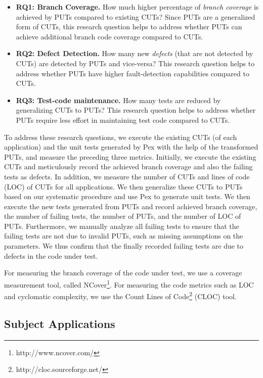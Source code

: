 \begin{itemize}
	\item \textbf{RQ1: Branch Coverage.} How much higher percentage of \emph{branch coverage} is achieved by PUTs compared to existing CUTs? Since PUTs are a generalized form of CUTs, this research question helps to address whether PUTs can achieve additional branch code coverage compared to CUTs.
	\item \textbf{RQ2: Defect Detection.} How many new \emph{defects} (that are not detected by CUTs) are detected by PUTs and vice-versa? This research question helps to address whether PUTs have higher fault-detection capabilities compared to CUTs.
	\item \textbf{RQ3: Test-code maintenance.} How many tests are reduced by generalizing CUTs to PUTs? This research question helps to address whether PUTs require less effort in maintaining test code compared to CUTs.
\end{itemize}

To address these research questions, we execute the existing CUTs (of each application) and the unit tests generated by Pex with the help of the transformed PUTs, and measure the preceding three metrics. Initially, we execute the existing CUTs and meticulously record the achieved branch coverage and also the failing tests as defects. In addition, we measure the number of CUTs and lines of code (LOC) of CUTs for all applications. We then generalize these CUTs to PUTs based on our systematic procedure and use Pex to generate unit tests. We then execute the new tests generated from PUTs and record achieved branch coverage, the number of failing tests, the number of PUTs, and the number of LOC of PUTs. Furthermore, we manually analyze all failing tests to ensure that the failing tests are not due to invalid PUTs, such as missing assumptions on the parameters. We thus confirm that the finally recorded failing tests are due to defects in the code under test.

For measuring the branch coverage of the code under test, we use a coverage measurement tool, called NCover\footnote{http://www.ncover.com/}. For measuring the code metrics such as LOC and cyclomatic complexity, we use the Count Lines of Code\footnote{http://cloc.sourceforge.net/} (CLOC) tool.

\subsection{Subject Applications}

